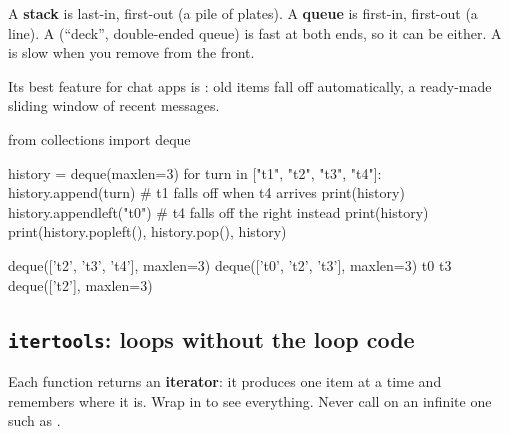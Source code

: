 A \textbf{stack} is last-in, first-out (a pile of plates). A \textbf{queue} is first-in,
first-out (a line). A  (``deck'', double-ended queue) is fast at both ends, so it
can be either. A  is slow when you remove from the front.

Its best feature for chat apps is : old items fall off automatically, a ready-made
sliding window of recent messages.

\begin{center}
\end{center}

\begin{pycode}
from collections import deque

history = deque(maxlen=3)
for turn in ["t1", "t2", "t3", "t4"]:
    history.append(turn)           # t1 falls off when t4 arrives
print(history)
history.appendleft("t0")           # t4 falls off the right instead
print(history)
print(history.popleft(), history.pop(), history)
\end{pycode}
\begin{rawcode}
deque(['t2', 't3', 't4'], maxlen=3)
deque(['t0', 't2', 't3'], maxlen=3)
t0 t3 deque(['t2'], maxlen=3)
\end{rawcode}

\subsection{\texttt{itertools}: loops without the loop code}

Each function returns an \textbf{iterator}: it produces one item at a time and remembers
where it is. Wrap in  to see everything. Never call  on an infinite
one such as .

